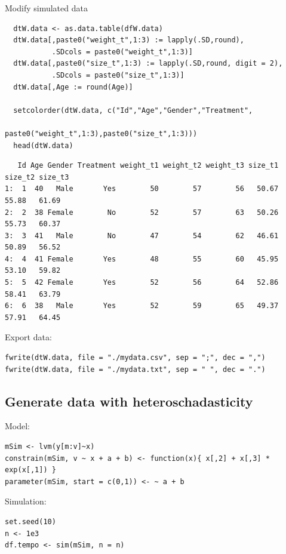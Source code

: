 \documentclass{article}
\begin{document}
Modify simulated data 
\lstset{language=r,label= ,caption= ,captionpos=b,numbers=none}
\begin{lstlisting}
  dtW.data <- as.data.table(dfW.data)
  dtW.data[,paste0("weight_t",1:3) := lapply(.SD,round),
           .SDcols = paste0("weight_t",1:3)]
  dtW.data[,paste0("size_t",1:3) := lapply(.SD,round, digit = 2),
           .SDcols = paste0("size_t",1:3)]
  dtW.data[,Age := round(Age)]

  setcolorder(dtW.data, c("Id","Age","Gender","Treatment",
                          paste0("weight_t",1:3),paste0("size_t",1:3)))
  head(dtW.data)
\end{lstlisting}

\begin{verbatim}
   Id Age Gender Treatment weight_t1 weight_t2 weight_t3 size_t1 size_t2 size_t3
1:  1  40   Male       Yes        50        57        56   50.67   55.88   61.69
2:  2  38 Female        No        52        57        63   50.26   55.73   60.37
3:  3  41   Male        No        47        54        62   46.61   50.89   56.52
4:  4  41 Female       Yes        48        55        60   45.95   53.10   59.82
5:  5  42 Female       Yes        52        56        64   52.86   58.41   63.79
6:  6  38   Male       Yes        52        59        65   49.37   57.91   64.45
\end{verbatim}


Export data:
\lstset{language=r,label= ,caption= ,captionpos=b,numbers=none}
\begin{lstlisting}
fwrite(dtW.data, file = "./mydata.csv", sep = ";", dec = ",")
fwrite(dtW.data, file = "./mydata.txt", sep = " ", dec = ".")
\end{lstlisting}

\subsection{Generate data with heteroschadasticity}
\label{sec:orga2efab5}

Model:
\lstset{language=r,label= ,caption= ,captionpos=b,numbers=none}
\begin{lstlisting}
mSim <- lvm(y[m:v]~x)
constrain(mSim, v ~ x + a + b) <- function(x){ x[,2] + x[,3] * exp(x[,1]) }
parameter(mSim, start = c(0,1)) <- ~ a + b
\end{lstlisting}

Simulation:
\lstset{language=r,label= ,caption= ,captionpos=b,numbers=none}
\begin{lstlisting}
set.seed(10)
n <- 1e3
df.tempo <- sim(mSim, n = n)
\end{lstlisting}
\end{document}
